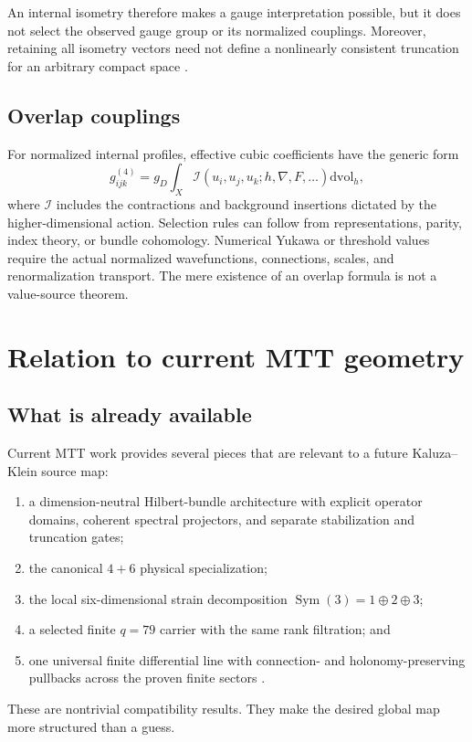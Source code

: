 \documentclass[11pt]{article}
\theoremstyle{definition}
\theoremstyle{remark}
\newcommand{\dd}{\mathrm d}
\newcommand{\cI}{\mathcal I}
\let\MTToriginalitem\item
\renewcommand{\item}{\par\MTToriginalitem}
\begin{document}
An internal isometry therefore makes a gauge interpretation possible, but
it does not select the observed gauge group or its normalized couplings.
Moreover, retaining all isometry vectors need not define a nonlinearly
consistent truncation for an arbitrary compact space
\cite{CveticLuPope2000}.

\subsection{Overlap couplings}

For normalized internal profiles, effective cubic coefficients have the
generic form
\[
 g_{ijk}^{(4)}
 =
 g_D
 \int_X
 \cI\!\left(u_i,u_j,u_k;
 h,\nabla,F,\ldots\right)
 \dd\mathrm{vol}_h ,
\]
where \(\cI\) includes the contractions and background insertions dictated
by the higher-dimensional action.  Selection rules can follow from
representations, parity, index theory, or bundle cohomology.  Numerical
Yukawa or threshold values require the actual normalized wavefunctions,
connections, scales, and renormalization transport.  The mere existence of
an overlap formula is not a value-source theorem.

\section{Relation to current MTT geometry}
\label{sec:status}

\subsection{What is already available}

Current MTT work provides several pieces that are relevant to a future
Kaluza--Klein source map:
\begin{enumerate}[leftmargin=2em]
\item a dimension-neutral Hilbert-bundle architecture with explicit
      operator domains, coherent spectral projectors, and separate
      stabilization and truncation gates;
\item the canonical \(4+6\) physical specialization;
\item the local six-dimensional strain decomposition
      \(\operatorname{Sym}(3)=1\oplus2\oplus3\);
\item a selected finite \(q=79\) carrier with the same rank filtration; and
\item one universal finite differential line with connection- and
      holonomy-preserving pullbacks across the proven finite sectors
      \cite{NeroFoundation}.
\end{enumerate}
These are nontrivial compatibility results.  They make the desired global
map more structured than a guess.
\end{document}
